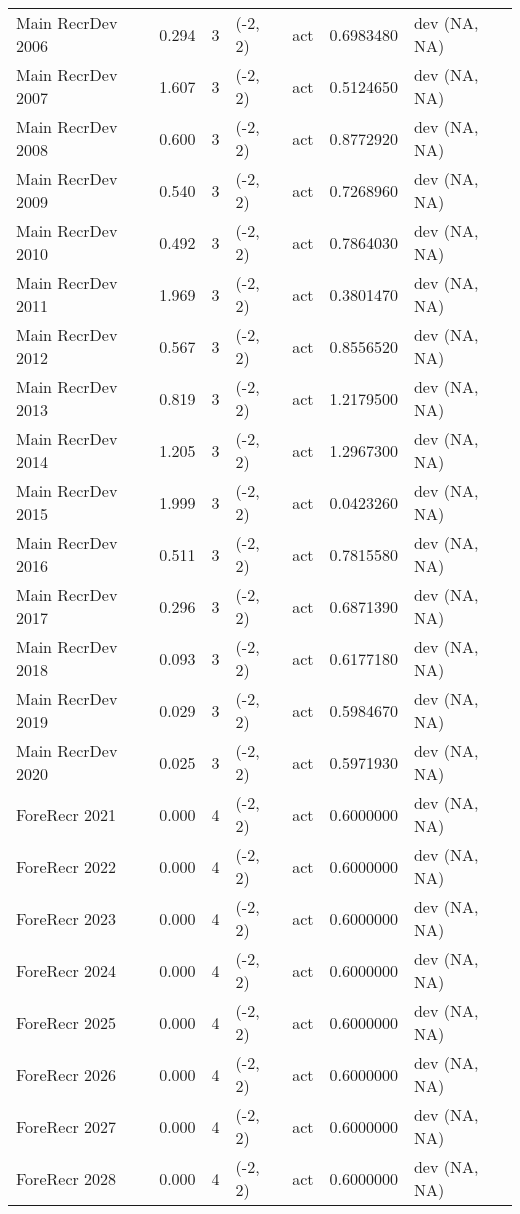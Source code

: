 \documentclass[11pt,
  english,
  a4paper,
]{article}
\begin{document}
\begin{landscape}
\begin{longtable}[t]{>{\raggedright\arraybackslash}p{6cm}lllll>{\raggedright\arraybackslash}p{4cm}}
Main RecrDev 2006 & 0.294 & 3 & (-2, 2) & act & 0.6983480 & dev (NA, NA)\\
Main RecrDev 2007 & 1.607 & 3 & (-2, 2) & act & 0.5124650 & dev (NA, NA)\\
Main RecrDev 2008 & 0.600 & 3 & (-2, 2) & act & 0.8772920 & dev (NA, NA)\\
Main RecrDev 2009 & 0.540 & 3 & (-2, 2) & act & 0.7268960 & dev (NA, NA)\\
Main RecrDev 2010 & 0.492 & 3 & (-2, 2) & act & 0.7864030 & dev (NA, NA)\\
Main RecrDev 2011 & 1.969 & 3 & (-2, 2) & act & 0.3801470 & dev (NA, NA)\\
Main RecrDev 2012 & 0.567 & 3 & (-2, 2) & act & 0.8556520 & dev (NA, NA)\\
Main RecrDev 2013 & 0.819 & 3 & (-2, 2) & act & 1.2179500 & dev (NA, NA)\\
Main RecrDev 2014 & 1.205 & 3 & (-2, 2) & act & 1.2967300 & dev (NA, NA)\\
Main RecrDev 2015 & 1.999 & 3 & (-2, 2) & act & 0.0423260 & dev (NA, NA)\\
Main RecrDev 2016 & 0.511 & 3 & (-2, 2) & act & 0.7815580 & dev (NA, NA)\\
Main RecrDev 2017 & 0.296 & 3 & (-2, 2) & act & 0.6871390 & dev (NA, NA)\\
Main RecrDev 2018 & 0.093 & 3 & (-2, 2) & act & 0.6177180 & dev (NA, NA)\\
Main RecrDev 2019 & 0.029 & 3 & (-2, 2) & act & 0.5984670 & dev (NA, NA)\\
Main RecrDev 2020 & 0.025 & 3 & (-2, 2) & act & 0.5971930 & dev (NA, NA)\\
ForeRecr 2021 & 0.000 & 4 & (-2, 2) & act & 0.6000000 & dev (NA, NA)\\
ForeRecr 2022 & 0.000 & 4 & (-2, 2) & act & 0.6000000 & dev (NA, NA)\\
ForeRecr 2023 & 0.000 & 4 & (-2, 2) & act & 0.6000000 & dev (NA, NA)\\
ForeRecr 2024 & 0.000 & 4 & (-2, 2) & act & 0.6000000 & dev (NA, NA)\\
ForeRecr 2025 & 0.000 & 4 & (-2, 2) & act & 0.6000000 & dev (NA, NA)\\
ForeRecr 2026 & 0.000 & 4 & (-2, 2) & act & 0.6000000 & dev (NA, NA)\\
ForeRecr 2027 & 0.000 & 4 & (-2, 2) & act & 0.6000000 & dev (NA, NA)\\
ForeRecr 2028 & 0.000 & 4 & (-2, 2) & act & 0.6000000 & dev (NA, NA)\\

\end{longtable}
\end{landscape}
\end{document}
